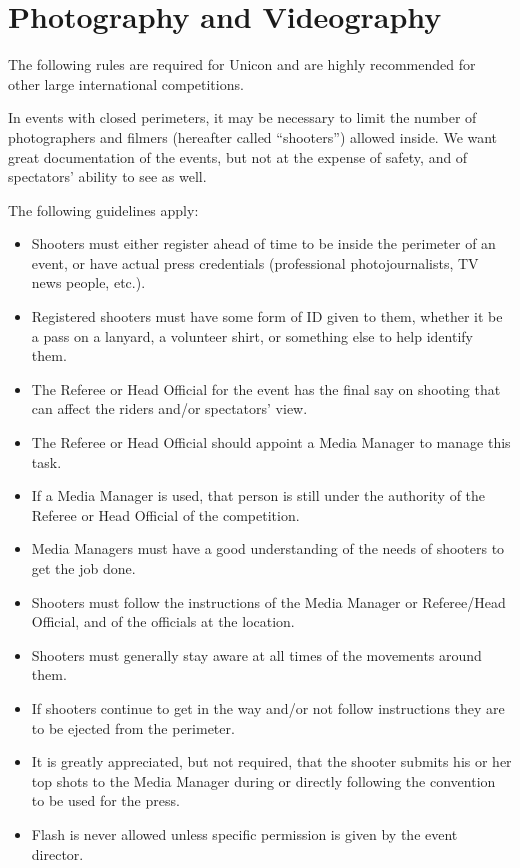 \section{Photography and Videography}
The following rules are required for Unicon and are highly recommended for other large international competitions.

In events with closed perimeters, it may be necessary to limit the number of photographers and filmers (hereafter called ``shooters'') allowed inside.
We want great documentation of the events, but not at the expense of safety, and of spectators' ability to see as well.

The following guidelines apply:
\begin{itemize}
\item Shooters must either register ahead of time to be inside the perimeter of an event, or have actual press credentials (professional photojournalists, TV news people, etc.).
\item Registered shooters must have some form of ID given to them, whether it be a pass on a lanyard, a volunteer shirt, or something else to help identify them.
\item The Referee or Head Official for the event has the final say on shooting that can affect the riders and/or spectators' view.
\item The Referee or Head Official should appoint a Media Manager to manage this task.
\item If a Media Manager is used, that person is still under the authority of the Referee or Head Official of the competition.
\item Media Managers must have a good understanding of the needs of shooters to get the job done.
\item Shooters must follow the instructions of the Media Manager or Referee/Head Official, and of the officials at the location.
\item Shooters must generally stay aware at all times of the movements around them.
\item If shooters continue to get in the way and/or not follow instructions they are to be ejected from the perimeter.
\item It is greatly appreciated, but not required, that the shooter submits his or her top shots to the Media Manager during or directly following the convention to be used for the press.
\item Flash is never allowed unless specific permission is given by the event director.
\end{itemize}

